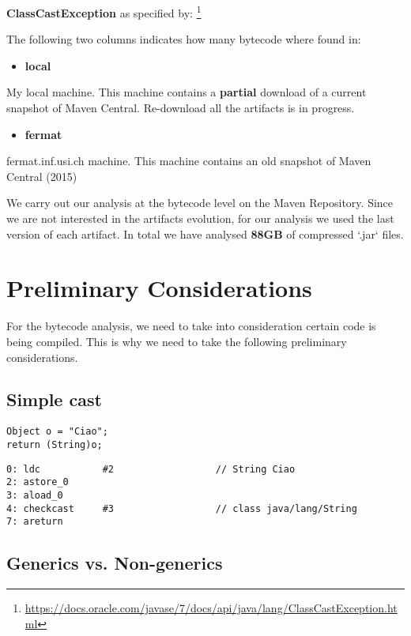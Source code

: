 \textbf{ClassCastException} as specified by: 
\footnote{\url{https://docs.oracle.com/javase/7/docs/api/java/lang/ClassCastException.html}} 

The following two columns indicates how many bytecode where found in: 
\begin{itemize}
\item \textbf{local}
\end{itemize}
My local machine. 
This machine contains a \textbf{partial} download of a current snapshot of Maven Central. 
Re-download all the artifacts is in progress. 
\begin{itemize}
\item \textbf{fermat}
\end{itemize}
fermat.inf.usi.ch machine. 
This machine contains an old snapshot of Maven Central (2015)  

We carry out our analysis at the bytecode level on the Maven Repository. 
Since we are not interested in the artifacts evolution, 
for our analysis we used the last version of each artifact. 
In total we have analysed \textbf{88GB} of compressed `.jar` files. 

\section{Preliminary Considerations}
\label{sec:org1870116}

For the bytecode analysis, we need to take into consideration certain code is being compiled. 
This is why we need to take the following preliminary considerations. 

\subsection{Simple cast}
\label{sec:org144c36d}

\lstset{language=java,label= ,caption= ,captionpos=b,numbers=none}
\begin{lstlisting}
Object o = "Ciao"; 
return (String)o; 
\end{lstlisting}

\begin{verbatim}
0: ldc           #2                  // String Ciao 
2: astore_0 
3: aload_0 
4: checkcast     #3                  // class java/lang/String 
7: areturn 
\end{verbatim}

\subsection{Generics vs. Non-generics}
\label{sec:org2757057}

